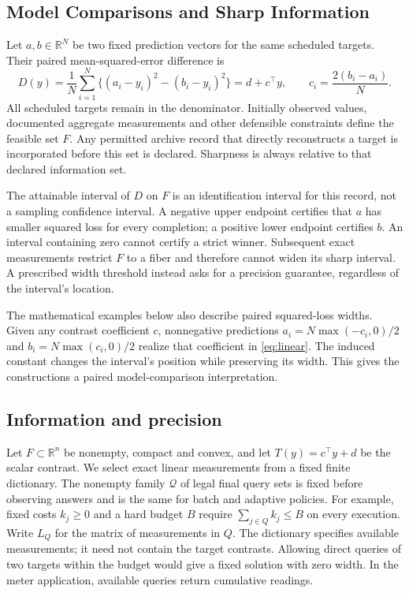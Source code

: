 \documentclass[12pt]{article}
\begin{document}
\subsection{Model Comparisons and Sharp Information}
Let $a,b\in\mathbb R^N$ be two fixed prediction vectors for the same
scheduled targets. Their paired mean-squared-error difference is
\begin{equation}
 D(y)=\frac1N\sum_{i=1}^N\{(a_i-y_i)^2-(b_i-y_i)^2\}
 =d+c^\top y,\qquad c_i=\frac{2(b_i-a_i)}N.
 \label{eq:linear}
\end{equation}
All scheduled targets remain in the denominator. Initially observed values,
documented aggregate measurements and other defensible constraints define
the feasible set $F$. Any permitted archive record that directly reconstructs
a target is incorporated before this set is declared. Sharpness is always
relative to that declared information set.

The attainable interval of $D$ on $F$ is an identification interval for
this record, not a sampling confidence interval. A negative upper endpoint
certifies that $a$ has smaller squared loss for every completion; a positive
lower endpoint certifies $b$. An interval containing zero cannot certify
a strict winner. Subsequent exact measurements restrict $F$ to a fiber and
therefore cannot widen its sharp interval. A prescribed width threshold
instead asks for a precision guarantee, regardless of the interval's location.

The mathematical examples below also describe paired squared-loss widths.
Given any contrast coefficient $c$, nonnegative predictions
$a_i=N\max(-c_i,0)/2$ and $b_i=N\max(c_i,0)/2$ realize that coefficient
in \eqref{eq:linear}. The induced constant changes the interval's position
while preserving its width. This gives the constructions a paired
model-comparison interpretation.

\subsection{Information and precision}
\label{sec:risk_setup}
Let $F\subset\mathbb R^n$ be nonempty, compact and convex, and let
$T(y)=c^\top y+d$ be the scalar contrast. We select exact linear
measurements from a fixed finite dictionary. The nonempty family
$\mathcal Q$ of legal final query sets is fixed before observing answers
and is the same for batch and adaptive policies. For example, fixed costs
$k_j\geq0$ and a hard budget $B$ require $\sum_{j\in Q}k_j\leq B$ on
every execution. Write $L_Q$ for the matrix of measurements in $Q$.
The dictionary specifies available measurements; it need not contain the
target contrasts. Allowing direct queries of two targets within the budget
would give a fixed solution with zero width. In the meter application,
available queries return cumulative readings.
\end{document}
